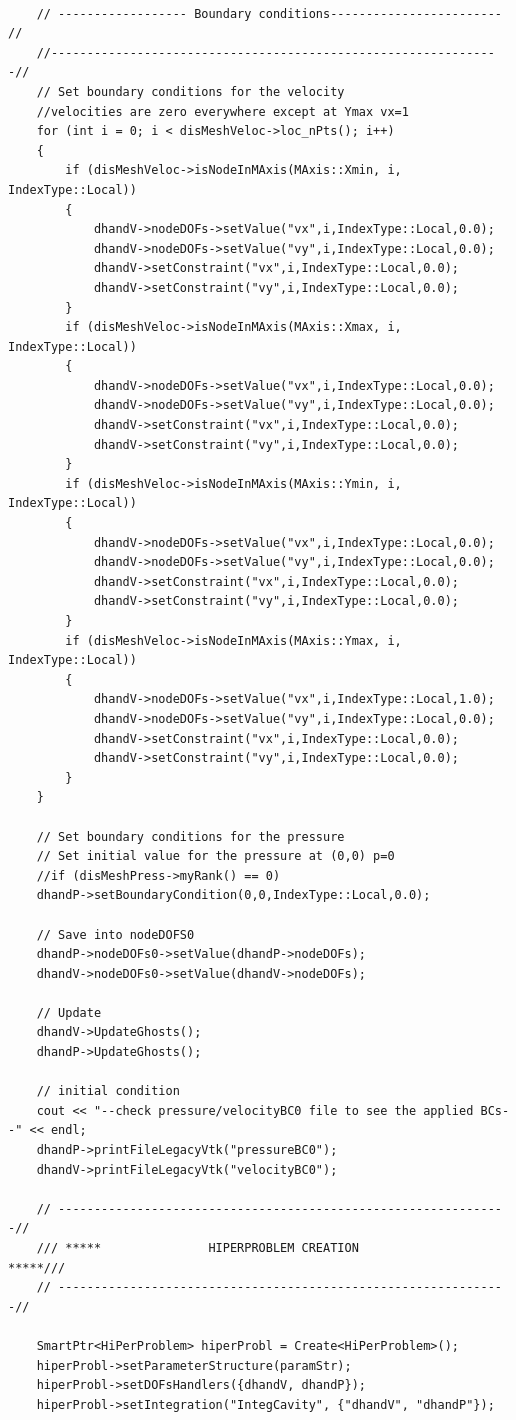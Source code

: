 \documentclass[]{article}
\begin{document}
\begin{lstlisting}
	
	// ------------------ Boundary conditions------------------------ //
	//---------------------------------------------------------------//
	// Set boundary conditions for the velocity
	//velocities are zero everywhere except at Ymax vx=1
	for (int i = 0; i < disMeshVeloc->loc_nPts(); i++)
	{
		if (disMeshVeloc->isNodeInMAxis(MAxis::Xmin, i, IndexType::Local))
		{
			dhandV->nodeDOFs->setValue("vx",i,IndexType::Local,0.0);
			dhandV->nodeDOFs->setValue("vy",i,IndexType::Local,0.0);
			dhandV->setConstraint("vx",i,IndexType::Local,0.0);
			dhandV->setConstraint("vy",i,IndexType::Local,0.0);
		}
		if (disMeshVeloc->isNodeInMAxis(MAxis::Xmax, i, IndexType::Local))
		{
			dhandV->nodeDOFs->setValue("vx",i,IndexType::Local,0.0);
			dhandV->nodeDOFs->setValue("vy",i,IndexType::Local,0.0);
			dhandV->setConstraint("vx",i,IndexType::Local,0.0);
			dhandV->setConstraint("vy",i,IndexType::Local,0.0);
		}
		if (disMeshVeloc->isNodeInMAxis(MAxis::Ymin, i, IndexType::Local))
		{
			dhandV->nodeDOFs->setValue("vx",i,IndexType::Local,0.0);
			dhandV->nodeDOFs->setValue("vy",i,IndexType::Local,0.0);
			dhandV->setConstraint("vx",i,IndexType::Local,0.0);
			dhandV->setConstraint("vy",i,IndexType::Local,0.0);
		}
		if (disMeshVeloc->isNodeInMAxis(MAxis::Ymax, i, IndexType::Local))
		{
			dhandV->nodeDOFs->setValue("vx",i,IndexType::Local,1.0);
			dhandV->nodeDOFs->setValue("vy",i,IndexType::Local,0.0);
			dhandV->setConstraint("vx",i,IndexType::Local,0.0);
			dhandV->setConstraint("vy",i,IndexType::Local,0.0);
		}
	}
	
	// Set boundary conditions for the pressure
	// Set initial value for the pressure at (0,0) p=0 
	//if (disMeshPress->myRank() == 0)
	dhandP->setBoundaryCondition(0,0,IndexType::Local,0.0);
	
	// Save into nodeDOFS0
	dhandP->nodeDOFs0->setValue(dhandP->nodeDOFs);
	dhandV->nodeDOFs0->setValue(dhandV->nodeDOFs);
	
	// Update
	dhandV->UpdateGhosts();
	dhandP->UpdateGhosts();
	
	// initial condition
	cout << "--check pressure/velocityBC0 file to see the applied BCs--" << endl;
	dhandP->printFileLegacyVtk("pressureBC0");
	dhandV->printFileLegacyVtk("velocityBC0");
	
	// ---------------------------------------------------------------//
	/// *****               HIPERPROBLEM CREATION               *****///
	// ---------------------------------------------------------------//
	
	SmartPtr<HiPerProblem> hiperProbl = Create<HiPerProblem>();
	hiperProbl->setParameterStructure(paramStr);
	hiperProbl->setDOFsHandlers({dhandV, dhandP});
	hiperProbl->setIntegration("IntegCavity", {"dhandV", "dhandP"});
	

\end{lstlisting}
\end{document}
